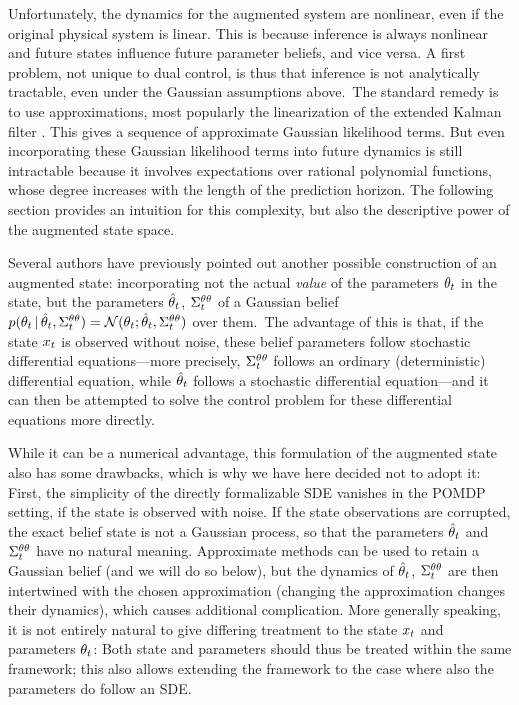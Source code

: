 Unfortunately, the dynamics for the augmented system are nonlinear, even if the
original physical system is linear. This is because inference is always
nonlinear and future states influence future parameter beliefs, and vice versa.
A first problem, not unique to dual control, is thus that inference is not
analytically tractable, even under the Gaussian assumptions
%
above.~\iss The standard
remedy is to use approximations, most popularly the linearization of the
extended Kalman filter \cite[]{Sarkka:2013:Bayesian}. This gives a
sequence of approximate Gaussian likelihood terms. But even incorporating these
Gaussian likelihood terms into future dynamics is still intractable because it
involves expectations over rational polynomial functions, whose degree increases
with the length of the prediction horizon. The following section provides an
intuition for this complexity, but also the descriptive power of the augmented
state space.

\begin{remark}
Several authors have previously pointed out another
possible construction of an augmented state: incorporating not the actual
\emph{value} of the parameters $\theta_t$ in the state, but the parameters
$\hat{\theta}_t$, $\Sigma^{\theta\theta}_t$ of a Gaussian belief $p(\theta_t\,|\,
\hat{\theta}_t,\Sigma^{\theta\theta}_t) =
\mathcal{N}(\theta_t;\hat{\theta}_t,\Sigma^{\theta\theta}_t)$ over
%
them.~\iss The advantage of
this is that, if the state $x_t$ is observed without noise, these belief
parameters follow stochastic differential equations---more precisely,
$\Sigma^{\theta\theta}_t$ follows an ordinary (deterministic) differential equation,
while $\hat{\theta}_t$ follows a stochastic differential equation---and it can then
be attempted to solve the control problem for these differential equations more
directly.

While it can be a numerical advantage, this formulation of the augmented state
also has some drawbacks, which is why we have here decided not to adopt it:
First, the simplicity of the directly formalizable SDE vanishes in the POMDP
setting, \ie if the state is observed with noise. If the state
observations are corrupted, the exact belief state is not a Gaussian process,
so that the parameters $\hat{\theta}_t$ and $\Sigma^{\theta\theta}_t$ have no natural
meaning. Approximate methods can be used to retain a Gaussian belief (and we
will do so below), but the dynamics of $\hat{\theta}_t$, $\Sigma^{\theta\theta}_t$ are
then intertwined with the chosen approximation (\ie changing the approximation
changes their dynamics), which causes additional complication. More generally
speaking, it is not entirely natural to give differing treatment to the state
$x_t$ and parameters $\theta_t$: Both state and parameters should thus be
treated within the same framework; this also allows extending the framework to
the case where also the parameters do follow an SDE.
\end{remark}

